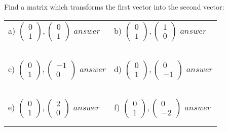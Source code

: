 \documentclass[fontsize=12pt]{scrartcl}
\begin{document}
\newpage
Find a matrix which transforms the first vector into the second vector:
\newline
\newline
\begin{tabular}{p{9cm}p{9cm}}
a) $\begin{pmatrix}0\\1\end{pmatrix}, \begin{pmatrix}0\\1\end{pmatrix}$
 \quad $answer$
&b) $\begin{pmatrix}0\\1\end{pmatrix}, \begin{pmatrix}1\\0\end{pmatrix}$
 \quad $answer$
\\\\\\
\\\\\\

c) $\begin{pmatrix}0\\1\end{pmatrix}, \begin{pmatrix}-1\\0\end{pmatrix}$
 \quad $answer$
&d) $\begin{pmatrix}0\\1\end{pmatrix}, \begin{pmatrix}0\\-1\end{pmatrix}$
 \quad $answer$
\\\\\\
\\\\\\

e) $\begin{pmatrix}0\\1\end{pmatrix}, \begin{pmatrix}2\\0\end{pmatrix}$
 \quad $answer$
&f) $\begin{pmatrix}0\\1\end{pmatrix}, \begin{pmatrix}0\\-2\end{pmatrix}$
 \quad $answer$
\\\\\\

\end{tabular}
\end{document}
